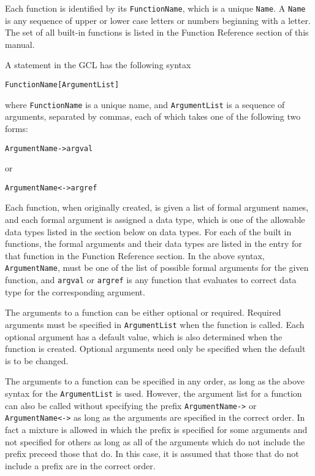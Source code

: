 Each function is identified by its \verb+FunctionName+, which is a
unique \verb+Name+.  A \verb+Name+ is any sequence of upper or lower
case letters or numbers beginning with a letter.  The set of all
built-in functions is listed in the Function Reference section of this
manual.

A statement in the GCL has the
following syntax
\begin{verbatim}
FunctionName[ArgumentList]
\end{verbatim}
where \verb+FunctionName+ is a unique name, and \verb+ArgumentList+ is
a sequence of arguments, separated by commas, each of which takes one
of the following two forms:
\begin{verbatim}
ArgumentName->argval
\end{verbatim}
or
\begin{verbatim}
ArgumentName<->argref
\end{verbatim}

Each function, when originally created, is given a list of formal
argument names, and each formal argument is assigned a data type,
which is one of the allowable data types listed in the section below
on data types.  For each of the built in functions, the formal
arguments and their data types are listed in the entry for that
function in the Function Reference section.  In the above syntax,
\verb+ArgumentName+, must be one of the list of possible formal
arguments for the given function, and \verb+argval+ or \verb+argref+
is any function that evaluates to correct data type for the
corresponding argument. 

The arguments to a function can be either optional or required.
Required arguments must be specified in \verb+ArgumentList+ when the
function is called.  Each optional argument has a default value, which
is also determined when the function is created.  Optional arguments
need only be specified when the default is to be changed.

The arguments to a function can be specified in any order, as long as
the above syntax for the \verb+ArgumentList+ is used.  However, the
argument list for a function can also be called without specifying the 
prefix \verb+ArgumentName->+ or \verb+ArgumentName<->+ as long as the 
arguments are specified in the correct order.  In fact a mixture is 
allowed in which the prefix is specified for some arguments and not
specified for others as long as all of the arguments which do not
include the prefix preceed those that do.  In this case, it is assumed
that those that do not include a prefix are in the correct order.  

